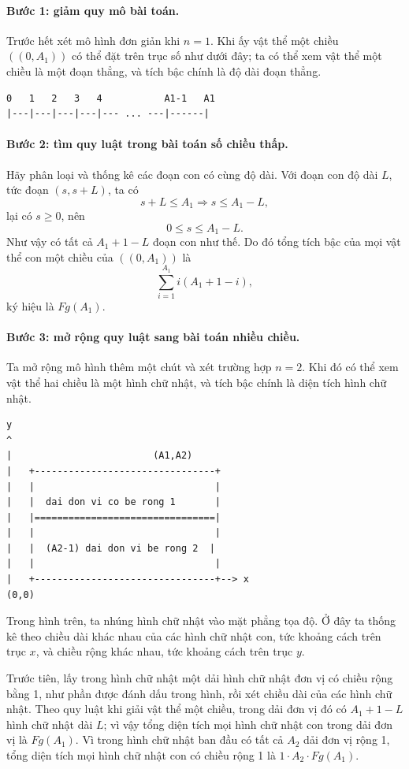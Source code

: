 \documentclass[11pt]{article}
\begin{document}
\paragraph{Bước 1: giảm quy mô bài toán.}
Trước hết xét mô hình đơn giản khi \(n=1\). Khi ấy vật thể một chiều
\(((0,A_1))\) có thể đặt trên trục số như dưới đây; ta có thể xem vật thể một
chiều là một đoạn thẳng, và tích bậc chính là độ dài đoạn thẳng.

\begin{verbatim}
0   1   2   3   4           A1-1   A1
|---|---|---|---|--- ... ---|------|
\end{verbatim}

\paragraph{Bước 2: tìm quy luật trong bài toán số chiều thấp.}
Hãy phân loại và thống kê các đoạn con có cùng độ dài. Với đoạn con độ dài
\(L\), tức đoạn \((s,s+L)\), ta có
\[
s+L\le A_1 \Rightarrow s\le A_1-L,
\]
lại có \(s\ge0\), nên
\[
0\le s\le A_1-L.
\]
Như vậy có tất cả \(A_1+1-L\) đoạn con như thế. Do đó tổng tích bậc của mọi
vật thể con một chiều của \(((0,A_1))\) là
\[
\sum_{i=1}^{A_1} i(A_1+1-i),
\]
ký hiệu là \(Fg(A_1)\).

\paragraph{Bước 3: mở rộng quy luật sang bài toán nhiều chiều.}
Ta mở rộng mô hình thêm một chút và xét trường hợp \(n=2\). Khi đó có thể xem
vật thể hai chiều là một hình chữ nhật, và tích bậc chính là diện tích hình
chữ nhật.

\begin{verbatim}
y
^
|                         (A1,A2)
|   +--------------------------------+
|   |                                |
|   |  dai don vi co be rong 1       |
|   |================================|
|   |                                |
|   |  (A2-1) dai don vi be rong 2  |
|   |                                |
|   +--------------------------------+--> x
(0,0)
\end{verbatim}

Trong hình trên, ta nhúng hình chữ nhật vào mặt phẳng tọa độ. Ở đây ta thống
kê theo chiều dài khác nhau của các hình chữ nhật con, tức khoảng cách trên
trục \(x\), và chiều rộng khác nhau, tức khoảng cách trên trục \(y\).

Trước tiên, lấy trong hình chữ nhật một dải hình chữ nhật đơn vị có chiều
rộng bằng 1, như phần được đánh dấu trong hình, rồi xét chiều dài của các
hình chữ nhật. Theo quy luật khi giải vật thể một chiều, trong dải đơn vị đó
có \(A_1+1-L\) hình chữ nhật dài \(L\); vì vậy tổng diện tích mọi hình chữ
nhật con trong dải đơn vị là \(Fg(A_1)\). Vì trong hình chữ nhật ban đầu có
tất cả \(A_2\) dải đơn vị rộng 1, tổng diện tích mọi hình chữ nhật con có
chiều rộng 1 là \(1\cdot A_2\cdot Fg(A_1)\).
\end{document}
